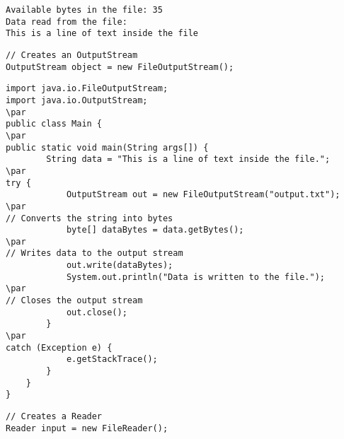 \documentclass{book}
\def\lthtmlcheckvsize{\ifdim\ht\sizebox<\vsize 
  \ifdim\wd\sizebox<\hsize\expandafter\hfill\fi \expandafter\vfill
  \else\expandafter\vss\fi}%
\begin{document}
{\newpage\clearpage
{}%
\begin{lstlisting}
Available bytes in the file: 35
Data read from the file:
This is a line of text inside the file
\end{lstlisting}%
\lthtmlfigureZ
\lthtmlcheckvsize\clearpage}

{\newpage\clearpage
{}%
\begin{lstlisting}
// Creates an OutputStream
OutputStream object = new FileOutputStream();
\end{lstlisting}%
\lthtmlfigureZ
\lthtmlcheckvsize\clearpage}

{\newpage\clearpage
{}%
\begin{lstlisting}
import java.io.FileOutputStream;
import java.io.OutputStream;
\par
public class Main {
\par
public static void main(String args[]) {
        String data = "This is a line of text inside the file.";
\par
try {
            OutputStream out = new FileOutputStream("output.txt");
\par
// Converts the string into bytes
            byte[] dataBytes = data.getBytes();
\par
// Writes data to the output stream
            out.write(dataBytes);
            System.out.println("Data is written to the file.");
\par
// Closes the output stream
            out.close();
        }
\par
catch (Exception e) {
            e.getStackTrace();
        }
    }
}
\end{lstlisting}%
\lthtmlfigureZ
\lthtmlcheckvsize\clearpage}

{\newpage\clearpage
{}%
\begin{lstlisting}
// Creates a Reader
Reader input = new FileReader();
\end{lstlisting}%
\lthtmlfigureZ
\lthtmlcheckvsize\clearpage}
\end{document}
